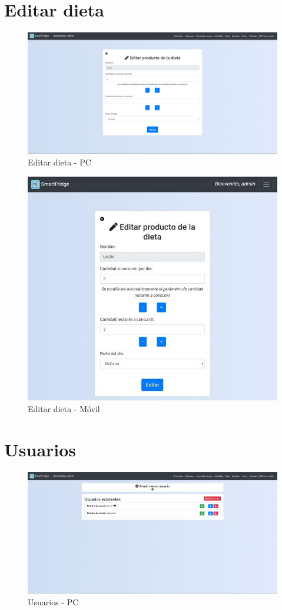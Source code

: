 \newpage
\section{Editar dieta}
\begin{figure}[h] 
    \centering
    \includegraphics[width=.90\textwidth]{capitulos/anexotres/PC/EditDiet.png}
    \caption{Editar dieta - PC}
    \label{fig:editdietpc}
\end{figure}

\begin{figure}[h] 
    \centering
    \includegraphics[width=.50\textwidth]{capitulos/anexotres/Phone/EditDiet.jpeg}
    \caption{Editar dieta - Móvil}
    \label{fig:editdietphone}
\end{figure}

\newpage
\section{Usuarios}
\begin{figure}[h] 
    \centering
    \includegraphics[width=.90\textwidth]{capitulos/anexotres/PC/User.png}
    \caption{Usuarios - PC}
    \label{fig:userpc}
\end{figure}

